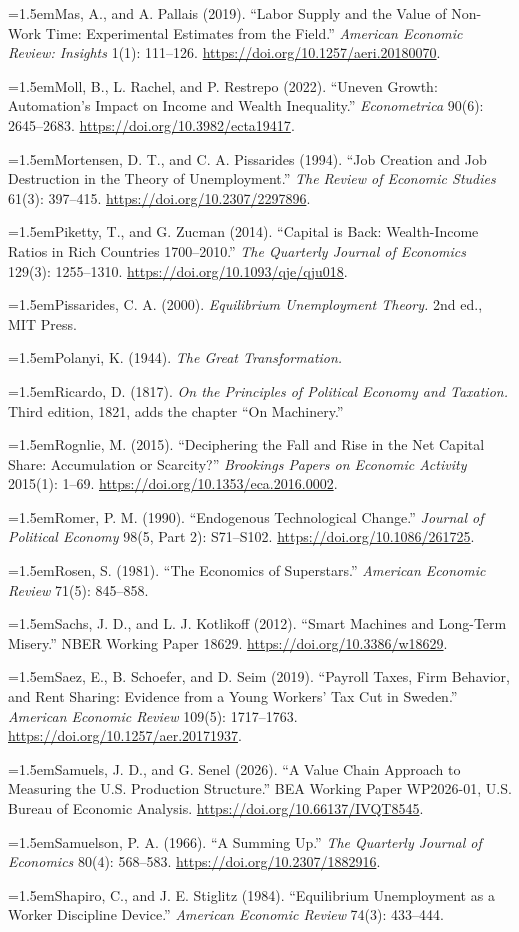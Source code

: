 \documentclass[12pt]{article}
\theoremstyle{plain}
\newcommand{\refentry}[1]{\par\hangindent=1.5em\hangafter=1\noindent #1}
\begin{document}
{\refentry{Mas, A., and A. Pallais (2019). ``Labor Supply and the Value of Non-Work Time: Experimental Estimates from the Field.'' \emph{American Economic Review: Insights} 1(1): 111--126. \url{https://doi.org/10.1257/aeri.20180070}.}
\refentry{Moll, B., L. Rachel, and P. Restrepo (2022). ``Uneven Growth: Automation's Impact on Income and Wealth Inequality.'' \emph{Econometrica} 90(6): 2645--2683. \url{https://doi.org/10.3982/ecta19417}.}
\refentry{Mortensen, D. T., and C. A. Pissarides (1994). ``Job Creation and Job Destruction in the Theory of Unemployment.'' \emph{The Review of Economic Studies} 61(3): 397--415. \url{https://doi.org/10.2307/2297896}.}
\refentry{Piketty, T., and G. Zucman (2014). ``Capital is Back: Wealth-Income Ratios in Rich Countries 1700--2010.'' \emph{The Quarterly Journal of Economics} 129(3): 1255--1310. \url{https://doi.org/10.1093/qje/qju018}.}
\refentry{Pissarides, C. A. (2000). \emph{Equilibrium Unemployment Theory.} 2nd ed., MIT Press.}
\refentry{Polanyi, K. (1944). \emph{The Great Transformation.}}
\refentry{Ricardo, D. (1817). \emph{On the Principles of Political Economy and Taxation.} Third edition, 1821, adds the chapter ``On Machinery.''}
\refentry{Rognlie, M. (2015). ``Deciphering the Fall and Rise in the Net Capital Share: Accumulation or Scarcity?'' \emph{Brookings Papers on Economic Activity} 2015(1): 1--69. \url{https://doi.org/10.1353/eca.2016.0002}.}
\refentry{Romer, P. M. (1990). ``Endogenous Technological Change.'' \emph{Journal of Political Economy} 98(5, Part 2): S71--S102. \url{https://doi.org/10.1086/261725}.}
\refentry{Rosen, S. (1981). ``The Economics of Superstars.'' \emph{American Economic Review} 71(5): 845--858.}
\refentry{Sachs, J. D., and L. J. Kotlikoff (2012). ``Smart Machines and Long-Term Misery.'' NBER Working Paper 18629. \url{https://doi.org/10.3386/w18629}.}
\refentry{Saez, E., B. Schoefer, and D. Seim (2019). ``Payroll Taxes, Firm Behavior, and Rent Sharing: Evidence from a Young Workers' Tax Cut in Sweden.'' \emph{American Economic Review} 109(5): 1717--1763. \url{https://doi.org/10.1257/aer.20171937}.}
\refentry{Samuels, J. D., and G. Senel (2026). ``A Value Chain Approach to Measuring the U.S. Production Structure.'' BEA Working Paper WP2026-01, U.S. Bureau of Economic Analysis. \url{https://doi.org/10.66137/IVQT8545}.}
\refentry{Samuelson, P. A. (1966). ``A Summing Up.'' \emph{The Quarterly Journal of Economics} 80(4): 568--583. \url{https://doi.org/10.2307/1882916}.}
\refentry{Shapiro, C., and J. E. Stiglitz (1984). ``Equilibrium Unemployment as a Worker Discipline Device.'' \emph{American Economic Review} 74(3): 433--444.}
}
\end{document}
